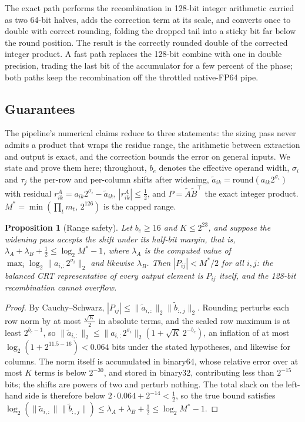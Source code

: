 \documentclass[11pt]{amsart}
\theoremstyle{plain}
\newtheorem{proposition}[theorem]{Proposition}
\theoremstyle{definition}
\begin{document}
The exact path performs the recombination in 128-bit integer arithmetic
carried as two 64-bit halves, adds the correction term at its scale, and
converts once to double with correct rounding, folding the dropped tail
into a sticky bit far below the round position. The result is the
correctly rounded double of the corrected integer product. A fast path
replaces the 128-bit combine with one in double precision, trading the
last bit of the accumulator for a few percent of the phase; both paths
keep the recombination off the throttled native-FP64 pipe.

\subsection{Guarantees}\label{sec:guarantees}

The pipeline's numerical claims reduce to three statements: the sizing
pass never admits a product that wraps the residue range, the arithmetic
between extraction and output is exact, and the correction bounds the
error on general inputs. We state and prove them here; throughout,
$b_e$ denotes the effective operand width, $\sigma_i$ and $\tau_j$ the
per-row and per-column shifts after widening,
$\tilde{a}_{ik} = \mathrm{round}(a_{ik} 2^{\sigma_i})$ with residual
$r^A_{ik} = a_{ik} 2^{\sigma_i} - \tilde{a}_{ik}$, $|r^A_{ik}| \le
\tfrac12$, and $P = \tilde{A} \tilde{B}^{\top}$ the exact integer
product. $M^{*} = \min(\prod_t m_t,\, 2^{126})$ is the capped range.

\begin{proposition}[Range safety]\label{prop:range}
Let $b_e \ge 16$ and $K \le 2^{23}$, and suppose the widening pass
accepts the shift under its half-bit margin, that is,
$\lambda_A + \lambda_B + \tfrac12 \le \log_2 M^{*} - 1$, where
$\lambda_A$ is the computed value of
$\max_i \log_2 \| a_{i,:} 2^{\sigma_i} \|_2$ and likewise $\lambda_B$.
Then $|P_{ij}| < M^{*}/2$ for all $i, j$: the balanced CRT representative
of every output element is $P_{ij}$ itself, and the 128-bit recombination
cannot overflow.
\end{proposition}

\begin{proof}
By Cauchy--Schwarz, $|P_{ij}| \le \|\tilde{a}_{i,:}\|_2
\|\tilde{b}_{:,j}\|_2$. Rounding perturbs each row norm by at most
$\tfrac{\sqrt{K}}{2}$ in absolute terms, and the scaled row maximum is at
least $2^{b_e - 1}$, so
$\|\tilde{a}_{i,:}\|_2 \le \|a_{i,:} 2^{\sigma_i}\|_2 (1 + \sqrt{K}\,
2^{-b_e})$, an inflation of at most $\log_2(1 + 2^{11.5 - 16}) < 0.064$
bits under the stated hypotheses, and likewise for columns. The norm
itself is accumulated in binary64, whose relative error over at most $K$
terms is below $2^{-30}$, and stored in binary32, contributing less than
$2^{-15}$ bits; the shifts are powers of two and perturb nothing. The
total slack on the left-hand side is therefore below
$2 \cdot 0.064 + 2^{-14} < \tfrac12$, so the true bound satisfies
$\log_2 (\|\tilde{a}_{i,:}\| \|\tilde{b}_{:,j}\|) \le \lambda_A +
\lambda_B + \tfrac12 \le \log_2 M^{*} - 1$.
\end{proof}
\end{document}
